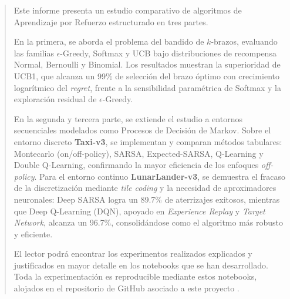 \renewcommand{\abstractname}{Resumen}

\begin{abstract}
    Este informe presenta un estudio comparativo de algoritmos de Aprendizaje por Refuerzo 
    estructurado en tres partes. 
    
    En la primera, se aborda el problema del bandido de $k$-brazos, 
    evaluando las familias $\epsilon$-Greedy, Softmax y UCB bajo distribuciones de recompensa Normal, 
    Bernoulli y Binomial. Los resultados muestran la superioridad de UCB1, que alcanza un 99\% de 
    selección del brazo óptimo con crecimiento logarítmico del \textit{regret}, frente a la 
    sensibilidad paramétrica de Softmax y la exploración residual de $\epsilon$-Greedy. 

    En la segunda y tercera parte, se extiende el estudio a entornos secuenciales modelados 
    como Procesos de Decisión de Markov. Sobre el entorno discreto \textbf{Taxi-v3}, se 
    implementan y comparan métodos tabulares: Montecarlo (on/off-policy), SARSA, Expected-SARSA, 
    Q-Learning y Double Q-Learning, confirmando la mayor eficiencia de los enfoques \textit{off-policy}. 
    Para el entorno continuo \textbf{LunarLander-v3}, se demuestra el fracaso de la discretización 
    mediante \textit{tile coding} y la necesidad de aproximadores neuronales: Deep SARSA logra un 
    89.7\% de aterrizajes exitosos, mientras que Deep Q-Learning (DQN), apoyado en 
    \textit{Experience Replay} y \textit{Target Network}, alcanza un 96.7\%, 
    consolidándose como el algoritmo más robusto y eficiente. 
    
    El lector podrá encontrar los experimentos realizados explicados y justificados en mayor detalle 
    en los notebooks que se han desarrollado. Toda la experimentación 
    es reproducible mediante estos notebooks, alojados en el repositorio de GitHub asociado a este proyecto \cite{repo2025carrillo_ibarrola_palomar}.
 \end{abstract}